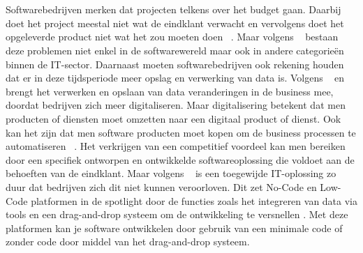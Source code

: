 
\chapter{}%
\label{ch:inleiding}



Softwarebedrijven merken dat projecten telkens over het budget gaan. Daarbij doet het project meestal niet wat de eindklant verwacht en vervolgens doet het opgeleverde product niet wat het zou moeten doen ~\autocite{Moskal_2021}.
Maar volgens ~\textcite{Moskal_2021} bestaan deze problemen niet enkel in de softwarewereld maar ook in andere categorieën binnen de IT-sector. 
Daarnaast moeten softwarebedrijven ook rekening houden dat er in deze tijdsperiode meer opslag en verwerking van data is.
Volgens ~\textcite{Moskal_2021} en ~\textcite{Parviainen_2022} brengt het verwerken en opslaan van data veranderingen in de business mee, 
doordat bedrijven zich meer digitaliseren. Maar digitalisering betekent dat men producten of diensten moet omzetten naar een digitaal product 
of dienst. Ook kan het zijn dat men software producten moet kopen om de business processen te automatiseren ~\autocite{Moskal_2021}. 
Het verkrijgen van een competitief voordeel kan men bereiken door een specifiek ontworpen en ontwikkelde softwareoplossing die voldoet aan de behoeften van de eindklant.
Maar volgens ~\textcite{Moskal_2021} is een toegewijde IT-oplossing zo duur dat bedrijven zich dit niet kunnen veroorloven. Dit zet No-Code en Low-Code platformen in de spotlight
door de functies zoals het integreren van data via tools en een drag-and-drop systeem om de ontwikkeling te versnellen \autocite{Kulkarni_2021}. Met deze platformen kan je software ontwikkelen door gebruik van een minimale code
of zonder code door middel van het drag-and-drop systeem.

